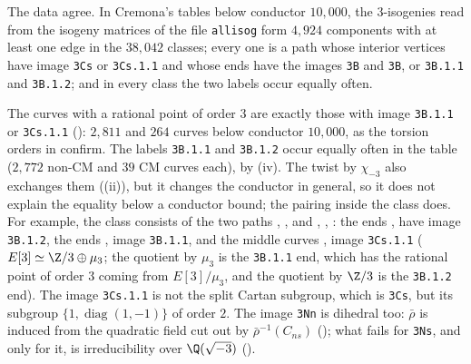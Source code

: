 The data agree. In Cremona's tables below conductor $10{,}000$, the $3$-isogenies read from the isogeny matrices of the file \texttt{allisog} form
$4{,}924$ components with at least one edge in the $38{,}042$ classes; every one is a path whose interior vertices have image \texttt{3Cs} or
\texttt{3Cs.1.1} and whose ends have the images \texttt{3B} and \texttt{3B}, or \texttt{3B.1.1} and \texttt{3B.1.2}; and in every class the two labels
occur equally often.

\begin{remark}
The curves with a rational point of order $3$ are exactly those with image \texttt{3B.1.1} or \texttt{3Cs.1.1} (): $2{,}811$
and $264$ curves below conductor $10{,}000$, as the torsion orders in \cite{ecdata} confirm. The labels \texttt{3B.1.1} and \texttt{3B.1.2} occur equally
often in the table ($2{,}772$ non-CM and $39$ CM curves each), by (iv). The twist by $\chi_{-3}$ also exchanges them
((ii)), but it changes the conductor in general, so it does not explain the equality below a conductor bound; the pairing
inside the class does. For example, the class  consists of the two paths , ,  and , ,
: the ends ,  have image \texttt{3B.1.2}, the ends ,  image \texttt{3B.1.1}, and the middle curves
,  image \texttt{3Cs.1.1} ($E[3]\simeq\Z/3\oplus\mu_3$; the quotient by $\mu_3$ is the \texttt{3B.1.1} end, which has the rational
point of order $3$ coming from $E[3]/\mu_3$, and the quotient by $\Z/3$ is the \texttt{3B.1.2} end). The
image \texttt{3Cs.1.1} is not the split Cartan subgroup, which is \texttt{3Cs}, but its subgroup $\{1,\operatorname{diag}(1,-1)\}$ of order $2$. The image \texttt{3Nn} is
dihedral too: $\bar\rho$ is induced from the quadratic field cut out by $\bar\rho^{-1}(C_{ns})$ (); what fails for \texttt{3Ns}, and
only for it, is irreducibility over $\Q(\sqrt{-3})$ ().
\end{remark}

